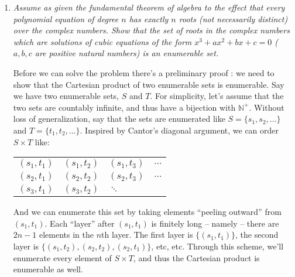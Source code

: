 
\usepackage{amsmath, dsfont, mathtools, verbatim, tikz, float}

\usetikzlibrary{arrows,automata}

\oddsidemargin 0in
\evensidemargin 0in
\textwidth 6.5in
\topmargin -0.5in
\textheight 9.0in
\newcommand{\norm}[1]{\left\lVert #1 \right\rVert}
\newcommand{\?}{\stackrel{?}{=}}
\DeclarePairedDelimiter{\ceil}{\lceil}{\rceil}



\pagestyle{myheadings}

\begin{enumerate}
  \item
    {\it 
    Assume as given the fundamental theorem of algebra to the effect that every polynomial equation of degree $n$ has exactly $n$ roots (not necessarily distinct) over the complex numbers. Show that the set of roots in the complex numbers which are solutions of cubic equations of the form $x^3 + ax^2 + bx + c = 0$ ($a, b, c$ are positive natural numbers) is an enumerable set.\\
    }

    Before we can solve the problem there's a preliminary proof : we need to show that the Cartesian product of two enumerable sets is enumerable. Say we have two enumerable sets, $S$ and $T$. For simplicity, let's assume that the two sets are countably infinite, and thus have a bijection with $\mathds{N}^+$. Without loss of generalization, say that the sets are enumerated like $S = \{s_1, s_2, \dots\}$ and $T = \{t_1, t_2, \dots \}$. Inspired by Cantor's diagonal argument, we can order $S \times T$ like:

    \begin{tabular}{ l l l l }
      $(s_1, t_1)$ & $(s_1, t_2)$ & $(s_1, t_3)$ & $\dots$ \\
      $(s_2, t_1)$ & $(s_2, t_2)$ & $(s_2, t_3)$ & $\dots$ \\
      $(s_3, t_1)$ & $(s_3, t_2)$ & $\ddots$ \\
    \end{tabular}

    And we can enumerate this set by taking elements ``peeling outward'' from $(s_1,t_1)$. Each ``layer'' after $(s_1,t_1)$ is finitely long -- namely -- there are $2n - 1$ elements in the $n$th layer. The first layer is $\{ (s_1, t_1) \}$, the second layer is $\{ (s_1, t_2) , (s_2, t_2), (s_2, t_1) \}$, etc, etc. Through this scheme, we'll enumerate every element of $S \times T$, and thus the Cartesian product is enumerable as well.\\


\end{enumerate}
